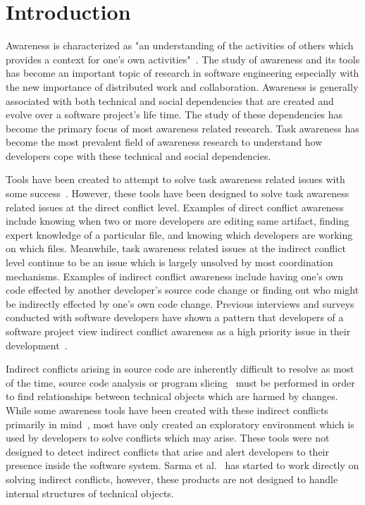 \documentclass[conference]{IEEEtran}
\begin{document}
\section{Introduction}
\thispagestyle{firststyle}
Awareness is characterized as "an understanding of the activities of others
which provides a context for one's own activities"~\cite{Dourish:1992:ACS}.
The study of awareness and its tools has become an important topic of
research in software engineering especially with the new importance of
distributed work and collaboration. Awareness is generally associated with
both technical and social dependencies that are created and evolve over
a software project's life time. The study of these dependencies has become
the primary focus of most awareness related research. Task awareness has
become the most prevalent field of awareness research to understand 
how developers cope with these technical and social dependencies.

Tools have been created to attempt to solve task awareness related issues
with some success~\cite{Xiang:2008:ERT, Biehl:2007:FVD, Sarma:2009:TIV, Khurana:2009:PFC}. However, these tools have been designed 
to solve task awareness related issues at the direct conflict level. 
Examples of direct conflict awareness include knowing when two or more 
developers are  editing same artifact, finding expert knowledge of a
particular file, and knowing which developers are working on which files.
Meanwhile, task awareness related issues at the indirect conflict level
continue to be an issue which is largely unsolved by most coordination
mechanisms. Examples of indirect conflict awareness
include having one's own code effected by another developer's source
code change or finding out who might be indirectly effected by one's
own code change. Previous interviews and surveys conducted with software developers have 
shown a pattern that developers of a software project view indirect conflict 
awareness  as a high priority issue in their development~\cite{Damian:2007:GSE, 
Halverson:2006:DTV, Begel:2010:CDE, Schroter:2012:TTF}.

Indirect conflicts arising in source code are inherently
difficult to resolve as most of the time, source code analysis or
program slicing~\cite{Weiser:1982:PUS} must
be performed in order to find relationships between technical objects
which are harmed by changes.
While some awareness tools have been created with these indirect conflicts
primarily in mind~\cite{Begel:2010:CDE, Trainer:2005:BGT}, most have only 
created an exploratory environment which is used by developers to
solve conflicts which may arise. These tools were not designed to detect
indirect conflicts that arise and alert developers to their presence 
inside the software system. Sarma et al.~\cite{Sarma:2007:TSA} has started to work directly
on solving indirect conflicts, however, these products are not designed to handle
internal structures of technical objects.
\end{document}
